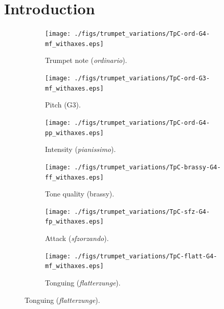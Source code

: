 
\newcommand*{\eg}{e.g.\@\xspace}
\newcommand*{\ie}{i.e.\@\xspace}
\newcommand*{\resp}{resp.\@\xspace}




\section{Introduction}

\begin{figure}
        \begin{subfigure}{0.25\textwidth}
                \centering
                \texttt{[image: ./figs/trumpet\_variations/TpC-ord-G4-mf\_withaxes.eps]}
                \caption{Trumpet note (\emph{ordinario}).}
                \label{fig:TpC-ord-G4-mf_withaxes}
        \end{subfigure}%
        \begin{subfigure}{0.25\textwidth}
                \centering
                \texttt{[image: ./figs/trumpet\_variations/TpC-ord-G3-mf\_withaxes.eps]}
                \caption{Pitch (G3).}
                \label{fig:TpC-ord-G3-mf_withaxes}
        \end{subfigure}%

        \begin{subfigure}{0.25\textwidth}
                \centering
                \texttt{[image: ./figs/trumpet\_variations/TpC-ord-G4-pp\_withaxes.eps]}
                \caption{Intensity (\emph{pianissimo}).}
                \label{fig:TpC-ord-G4-pp_withaxes}
        \end{subfigure}%
        \begin{subfigure}{0.25\textwidth}
                \centering
                \texttt{[image: ./figs/trumpet\_variations/TpC-brassy-G4-ff\_withaxes.eps]}
                \caption{Tone quality (brassy).}
                \label{fig:TpC-brassy-G4-mf_withaxes}
        \end{subfigure}%

        \begin{subfigure}{0.25\textwidth}
                \centering
                \texttt{[image: ./figs/trumpet\_variations/TpC-sfz-G4-fp\_withaxes.eps]}
                \caption{Attack (\emph{sfzorzando}).}
                \label{fig:TpC-sfz-G4-fp_withaxes}
        \end{subfigure}%
        \begin{subfigure}{0.25\textwidth}
                \centering
                \texttt{[image: ./figs/trumpet\_variations/TpC-flatt-G4-mf\_withaxes.eps]}
                \caption{Tonguing (\emph{flatterzunge}).}
                \label{fig:TpC-flatt-G4-mf_withaxes}
        \end{subfigure}



\end{figure}

